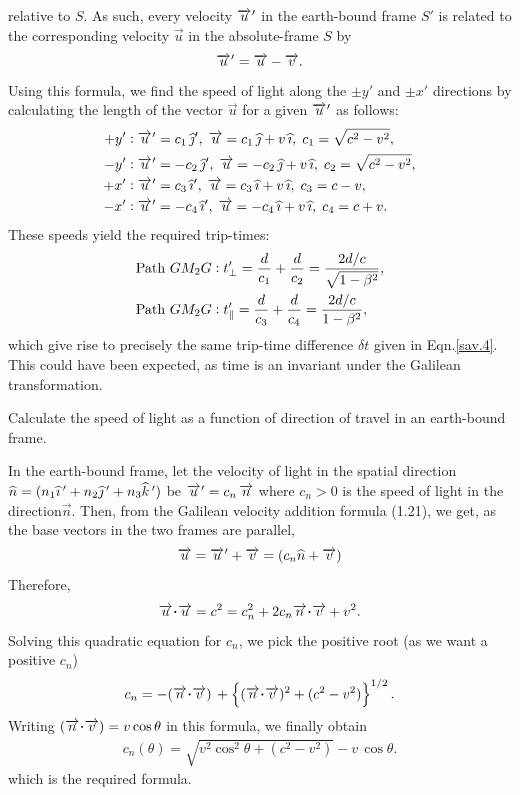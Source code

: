 relative to $S$. As such, every velocity ${\overrightarrow{u}\hspace*{.3pt}'}$ in the 
earth-bound frame $S'$ is related to the corresponding 
velocity $\vec{u}$ in the absolute-frame $S$ by
\begin{align}\label{sav.8}
{\ensuremath{\overrightarrow{u}\hspace*{.3pt}'}}=\overrightarrow{u}- \overrightarrow{v}.
\end{align}
Using this formula, we find the speed of light along the 
$\pm y'$ and $\pm x'$ directions by calculating the length 
of the vector $\vec{u}$ for a given ${\overrightarrow{u}\hspace*{.3pt}'}$ as follows:
\begin{align*}
+y': &\; {\overrightarrow{u}\hspace*{.3pt}'}=c_1
\,{\widehat{\jmath}}',\;\overrightarrow{u}=c_1
\,{\widehat{\jmath}}+ v \,{\widehat{\imath}},\; c_1= \sqrt{c^2-v^2},\\
-y':&\;{\overrightarrow{u}\hspace*{.3pt}'}=-c_2
\,{\widehat{\jmath}}',\;  \overrightarrow{u}=-c_2 \,{\widehat{\jmath}}+ v
\,{\widehat{\imath}},\;  c_2= \sqrt{c^2-v^2},\\
+x':&\;  {\overrightarrow{u}\hspace*{.3pt}'}=c_3
\,{\widehat{\imath}}',\; \overrightarrow{u}=c_3
\,{\widehat{\imath}} + v \,{\widehat{\imath}},\; c_3= c-v,\\
-x':& \; {\overrightarrow{u}\hspace*{.3pt}'}=-c_4
\,{\widehat{\imath}}',\; \overrightarrow{u}=-c_4
\,{\widehat{\imath}} + v \,{\widehat{\imath}},\;  c_4= c+v.
\end{align*}
These speeds yield the required trip-times:
\begin{align}
\text{Path }G M_2 G: \; &t'_\perp= \frac{d}{c_1}
+\frac{d}{ c_2} =\frac{2d/c}{\sqrt{1-\beta^2}}, \notag \\
\text{Path } G M_2 G:\;& t'_\parallel=\frac{d}{c_3}
+\frac{d}{ c_4} =\frac{2d/c}{1-\beta^2},
\end{align}
which give rise to precisely the same trip-time difference 
$\delta t$ given in Eqn.\eqref{sav.4}. This could have been 
expected, as time is an invariant under the Galilean 
transformation. \ebx

\exm Calculate the speed of light as a function of direction 
of travel in an earth-bound frame. 

\soln In the earth-bound frame, let the velocity of light  
in the spatial direction 
${\widehat{n}}=(n_1{\widehat{\imath}}\,'+n_2{\widehat{\jmath}}\,'+n_3{\widehat{k}}\,')$ be 
${\overrightarrow{u}\hspace*{.3pt}'}=c_n\, \overrightarrow{n}$ where $c_n >0$ is the speed of 
light in the direction$ \vec{n}$. Then, from the Galilean 
velocity addition formula (1.21), we get, as the base 
vectors in the two frames are parallel,
\begin{align}
\overrightarrow{u}={\overrightarrow{u}\hspace*{.3pt}'}
+\overrightarrow{v}=(c_n{\widehat{n}}+\overrightarrow{v})
\end{align}
Therefore,
\begin{align}
\vec{u}\dotp \vec{u}=c^2
=c_n^2+2c_n\vec{n}\dotp\vec{v}+v^2.
\end{align}
Solving this  quadratic equation for $c_n$, we pick the 
positive root (as we want a positive $c_n$)
\begin{align}
c_n =-(\vec{n}\dotp\vec{v})\, +
\left\{(\vec{n}\dotp\vec{v})^2
+(c^2-v^2)\right\}^{1/2}.
\end{align}
Writing $(\vec{n}\dotp\vec{v}) =v\cos\theta$ in this 
formula, 
we finally obtain
\begin{align}
c_n (\theta)=\sqrt{v^2\cos^2\theta
+(c^2-v^2)}-v\,\cos\theta.
\end{align}
which is the required formula. \ebx

